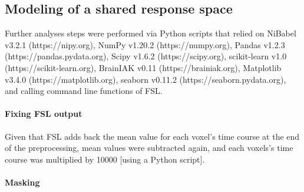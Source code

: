 \subsection{Modeling of a shared response space}


Further analyses steps were performed via Python scripts that relied on
%
NiBabel v3.2.1 (https://nipy.org),
%
NumPy v1.20.2 (https://numpy.org),
%
Pandas v1.2.3 (https://pandas.pydata.org),
%
Scipy v1.6.2 (https://scipy.org),
%
scikit-learn v1.0 (https://scikit-learn.org),
%
BrainIAK v0.11 (https://brainiak.org),
%
Matplotlib v3.4.0 (https://matplotlib.org),
%
seaborn v0.11.2 (https://seaborn.pydata.org),
%
and calling command line functions of FSL.

\paragraph{Fixing FSL output}





%
Given that FSL adds back the mean value for each voxel's time course at the end
of the preprocessing, mean values were subtracted again, and each voxels's time
course was multiplied by 10000 [using a Python script].


\paragraph{Masking}

